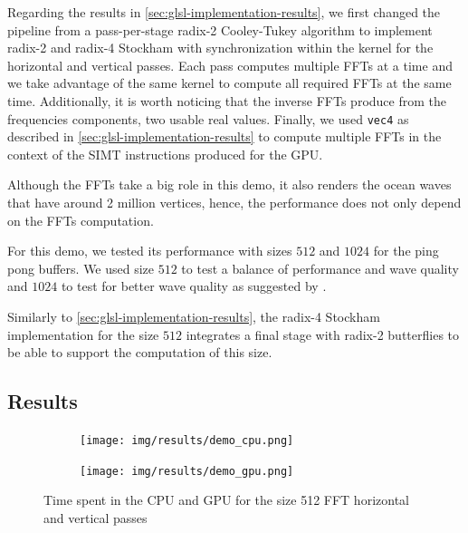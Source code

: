 \documentclass[
  oneside,
  11pt, a4paper,
  footinclude=true,
  headinclude=true,
  cleardoublepage=empty
]{scrbook}
\begin{document}
Regarding the results in \autoref{sec:glsl-implementation-results}, we first changed the pipeline from a pass-per-stage radix-2 Cooley-Tukey algorithm to implement radix-2 and radix-4 Stockham with synchronization within the kernel for the horizontal and vertical passes. Each pass computes multiple FFTs at a time and we take advantage of the same kernel to compute all required FFTs at the same time. Additionally, it is worth noticing that the inverse FFTs produce from the frequencies components, two usable real values. Finally, we used \texttt{vec4} as described in \autoref{sec:glsl-implementation-results} to compute multiple FFTs in the context of the SIMT instructions produced for the GPU. 

Although the FFTs take a big role in this demo, it also renders the ocean waves that have around 2 million vertices, hence, the performance does not only depend on the FFTs computation.
\newline


For this demo, we tested its performance with sizes $512$ and $1024$ for the ping pong buffers. We used size $512$ to test a balance of performance and wave quality and $1024$ to test for better wave quality as suggested by \cite{tessendorf2001simulating}.

Similarly to \autoref{sec:glsl-implementation-results}, the radix-4 Stockham implementation for the size $512$ integrates a final stage with radix-2 butterflies to be able to support the computation of this size.



\subsection{Results} \label{subsec:results}

\begin{figure}[H] 
    \begin{subfigure}{.5\textwidth}
        \centering
        \texttt{[image: img/results/demo\_cpu.png]}
    \end{subfigure}
    \begin{subfigure}{.5\textwidth}
        \centering
        \texttt{[image: img/results/demo\_gpu.png]}
    \end{subfigure}
    \caption{Time spent in the CPU and GPU for the size 512 FFT horizontal and vertical passes}
    \label{fig:demo}
\end{figure}
\end{document}
